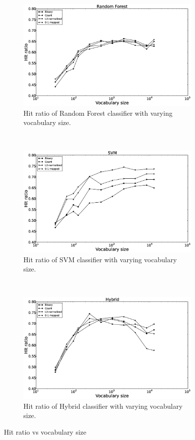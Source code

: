 \begin{figure}[H]
\begin{subfigure}[b]{\figwidth}
		\includegraphics[width=\textwidth]{Random-Forest-hitrate.eps}
		\caption{Hit ratio of Random Forest classifier with varying vocabulary size.}
		\label{fig:hitrate-rf}
	\end{subfigure}
	~
	\begin{subfigure}[b]{\figwidth}
		\includegraphics[width=\textwidth]{SVM-hitrate.eps}
		\caption{Hit ratio of SVM classifier with varying vocabulary size.}
		\label{fig:hitrate-svm}
	\end{subfigure}
	\\
	\begin{subfigure}[b]{\figwidth}
		\includegraphics[width=\textwidth]{Hybrid-hitrate.eps}
		\caption{Hit ratio of Hybrid classifier with varying vocabulary size.}
		\label{fig:hitrate-hybrid}
	\end{subfigure}
	\caption{Hit ratio vs vocabulary size}
	\label{fig:hitrate}
\end{figure}
\twocolumn
